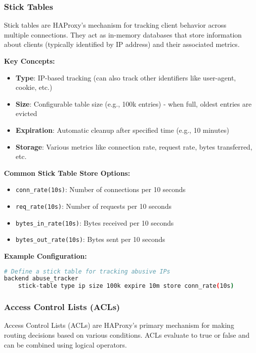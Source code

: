 \documentclass[12pt]{article}
\begin{document}
\subsubsection{Stick Tables}
Stick tables are HAProxy's mechanism for tracking client behavior across multiple connections. They act as in-memory databases that store information about clients (typically identified by IP address) and their associated metrics.

\textbf{Key Concepts:}
\begin{itemize}
    \item \textbf{Type}: IP-based tracking (can also track other identifiers like user-agent, cookie, etc.)
    \item \textbf{Size}: Configurable table size (e.g., 100k entries) - when full, oldest entries are evicted
    \item \textbf{Expiration}: Automatic cleanup after specified time (e.g., 10 minutes)
    \item \textbf{Storage}: Various metrics like connection rate, request rate, bytes transferred, etc.
\end{itemize}

\textbf{Common Stick Table Store Options:}
\begin{itemize}
    \item \texttt{conn\_rate(10s)}: Number of connections per 10 seconds
    \item \texttt{req\_rate(10s)}: Number of requests per 10 seconds
    \item \texttt{bytes\_in\_rate(10s)}: Bytes received per 10 seconds
    \item \texttt{bytes\_out\_rate(10s)}: Bytes sent per 10 seconds
\end{itemize}

\textbf{Example Configuration:}
\begin{lstlisting}[language=bash]
# Define a stick table for tracking abusive IPs
backend abuse_tracker
    stick-table type ip size 100k expire 10m store conn_rate(10s)
\end{lstlisting}

\subsubsection{Access Control Lists (ACLs)}
Access Control Lists (ACLs) are HAProxy's primary mechanism for making routing decisions based on various conditions. ACLs evaluate to true or false and can be combined using logical operators.
\end{document}

